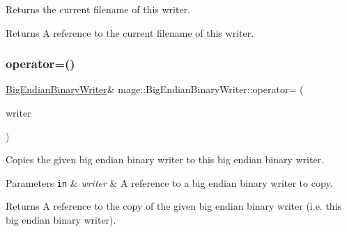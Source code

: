 Returns the current filename of this writer.

\begin{DoxyReturn}{Returns}
A reference to the current filename of this writer. 
\end{DoxyReturn}
\mbox{\label{classmage_1_1_big_endian_binary_writer_ae574f7d0b630890256996c52818ba633}} 
\subsubsection{\texorpdfstring{operator=()}{operator=()}\hspace{0.1cm}{\footnotesize\ttfamily [1/2]}}
{\footnotesize\ttfamily \mbox{\hyperlink{classmage_1_1_big_endian_binary_writer}{Big\+Endian\+Binary\+Writer}}\& mage\+::\+Big\+Endian\+Binary\+Writer\+::operator= (\begin{DoxyParamCaption}\item[{const \mbox{\hyperlink{classmage_1_1_big_endian_binary_writer}{Big\+Endian\+Binary\+Writer}} \&}]{writer }\end{DoxyParamCaption})\hspace{0.3cm}{\ttfamily [delete]}}

Copies the given big endian binary writer to this big endian binary writer.


\begin{DoxyParams}[1]{Parameters}
\mbox{\tt in}  & {\em writer} & A reference to a big endian binary writer to copy. \\
\hline
\end{DoxyParams}
\begin{DoxyReturn}{Returns}
A reference to the copy of the given big endian binary writer (i.\+e. this big endian binary writer). 
\end{DoxyReturn}
\mbox{\label{classmage_1_1_big_endian_binary_writer_a8c01bf43f5e941578c5c5947ea184a78}} 
